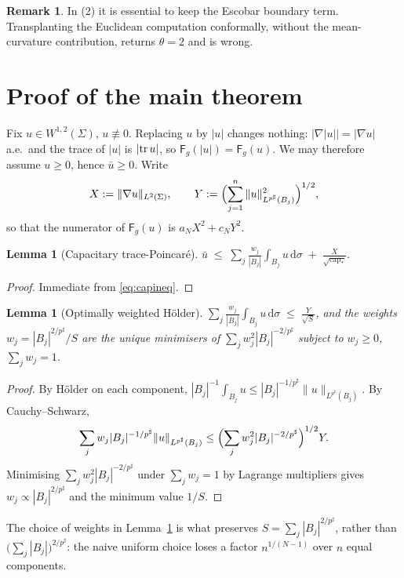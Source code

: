 \documentclass[11pt,reqno]{amsart}
\theoremstyle{plain}
\newtheorem{lemma}[theorem]{Lemma}
\theoremstyle{definition}
\newtheorem{remark}[theorem]{Remark}
\newcommand{\aN}{a_N}
\newcommand{\cN}{c_N}
\newcommand{\psharp}{p^{\sharp}}
\newcommand{\cpstar}{\operatorname{cap}_{*}}
\newcommand{\Fq}{\mathsf{F}}
\newcommand{\dd}{\,\mathrm{d}}
\begin{document}
\begin{remark}
\label{rem:escobar-trap}
In (2) it is essential to keep the Escobar boundary term. Transplanting the
Euclidean computation conformally, without the mean-curvature contribution, returns
$\theta=2$ and is wrong.
\end{remark}

\section{Proof of the main theorem}
\label{sec:proof}

Fix $u\in W^{1,2}(\Sigma)$, $u\not\equiv0$. Replacing $u$ by $|u|$ changes
nothing: $|\nabla|u||=|\nabla u|$ a.e.\ and the trace of $|u|$ is $|{\rm tr}\,u|$,
so $\Fq_g(|u|)=\Fq_g(u)$. We may therefore assume $u\ge0$, hence $\bar u\ge0$.
Write
\[
  X:=\|\nabla u\|_{L^2(\Sigma)},\qquad
  Y:=\Bigl(\sum_{j=1}^n\|u\|^2_{L^{\psharp}(B_j)}\Bigr)^{1/2},
\]
so that the numerator of $\Fq_g(u)$ is $\aN X^2+\cN Y^2$.

\begin{lemma}[Capacitary trace-Poincaré]
\label{lem:capacitary}
$\displaystyle \bar u\;\le\;\sum_j\frac{w_j}{|B_j|}\int_{B_j}u\dd\sigma
   \;+\;\frac{X}{\sqrt{\cpstar}}$.
\end{lemma}

\begin{proof}
Immediate from \eqref{eq:capineq}.
\end{proof}

\begin{lemma}[Optimally weighted Hölder]
\label{lem:holder}
$\displaystyle\sum_j\frac{w_j}{|B_j|}\int_{B_j}u\dd\sigma\;\le\;\frac{Y}{\sqrt S}$,
and the weights $w_j=|B_j|^{2/\psharp}/S$ are the unique minimisers of
$\sum_jw_j^2|B_j|^{-2/\psharp}$ subject to $w_j\ge0$, $\sum_jw_j=1$.
\end{lemma}

\begin{proof}
By Hölder on each component,
$|B_j|^{-1}\int_{B_j}u\le|B_j|^{-1/\psharp}\|u\|_{L^{\psharp}(B_j)}$. By
Cauchy--Schwarz,
\[
  \sum_jw_j|B_j|^{-1/\psharp}\|u\|_{L^{\psharp}(B_j)}
  \le\Bigl(\sum_jw_j^2|B_j|^{-2/\psharp}\Bigr)^{1/2}Y .
\]
Minimising $\sum_jw_j^2|B_j|^{-2/\psharp}$ under $\sum_jw_j=1$ by Lagrange
multipliers gives $w_j\propto|B_j|^{2/\psharp}$ and the minimum value $1/S$.
\end{proof}

The choice of weights in Lemma~\ref{lem:holder} is what preserves
$S=\sum_j|B_j|^{2/\psharp}$, rather than $\bigl(\sum_j|B_j|\bigr)^{2/\psharp}$:
the naive uniform choice loses a factor $n^{1/(N-1)}$ over $n$ equal
components.
\end{document}
